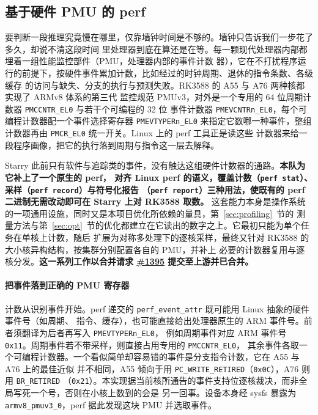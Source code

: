 \subsection{基于硬件 PMU 的 perf}\label{sec:perf}

要判断一段推理究竟慢在哪里，仅靠墙钟时间是不够的。墙钟只告诉我们一步花了多久，却说不清这段时间
里处理器到底在算还是在等。每一颗现代处理器内部都埋着一组性能监控部件（PMU，处理器内部的事件计数
器），它在不打扰程序运行的前提下，按硬件事件累加计数，比如经过的时钟周期、退休的指令条数、各级缓存
的访问与缺失、分支的执行与预测失败。RK3588 的 A55 与 A76 两种核都实现了 ARMv8 体系的第三代
监控规范 PMUv3，对外是一个专用的 64 位周期计数器 \texttt{PMCCNTR\_EL0} 与若干个可编程的 32 位
事件计数器 \texttt{PMEVCNTRn\_EL0}，每个可编程计数器配一个事件选择寄存器 \texttt{PMEVTYPERn\_EL0}
来指定它数哪一种事件，整组计数器再由 \texttt{PMCR\_EL0} 统一开关。Linux 上的 perf 工具正是读这些
计数器来给一段程序画像，把它的执行落到周期与指令这一层去解释。

Starry 此前只有软件与追踪类的事件，没有触达这组硬件计数器的通路。\textbf{本队为它补上了一个原生的 perf，
对齐 Linux perf 的语义，覆盖计数（\texttt{perf stat}）、采样（\texttt{perf record}）与符号化报告
（\texttt{perf report}）三种用法，使既有的 perf 二进制无需改动即可在 Starry 上对 RK3588 取数。}
这套能力本身是操作系统的一项通用设施，同时又是本项目优化所依赖的量具，第~\ref{sec:profiling}~节的
测量方法与第~\ref{sec:opt}~节的优化都建立在它读出的数字之上。它最初只能为单个任务在单核上计数，随后
扩展为对称多处理下的逐核采样，最终又针对 RK3588 的大小核异构结构，按集群分别配置各自的 PMU，并补上
必要的计数器复用与逐核分发。\textbf{这一系列工作以合并请求
\href{https://github.com/rcore-os/tgoskits/pull/1395}{\#1395} 提交至上游并已合并。}

\paragraph{把事件落到正确的 PMU 寄存器}
计数从识别事件开始。perf 递交的 \texttt{perf\_event\_attr} 既可能用 Linux 抽象的硬件事件号（如周期、
指令、缓存），也可能直接给出处理器原生的 ARM 事件号。前者须翻译为后者再写入 \texttt{PMEVTYPERn\_EL0}，
例如周期事件对应 ARM 事件号 \texttt{0x11}。周期事件若不带采样，则直接占用专用的 \texttt{PMCCNTR\_EL0}，
其余事件各取一个可编程计数器。一个看似简单却容易错的事件是分支指令计数，它在 A55 与 A76 上的最佳近似
并不相同，A55 倾向于用 \texttt{PC\_WRITE\_RETIRED}（\texttt{0x0C}），A76 则用 \texttt{BR\_RETIRED}
（\texttt{0x21}）。本实现据当前核所通告的事件支持位逐核裁决，而非全局写死一个号，否则在小核上数到的会是
另一回事。设备本身经 sysfs 暴露为 \texttt{armv8\_pmuv3\_0}，perf 据此发现这块 PMU 并选取事件。

